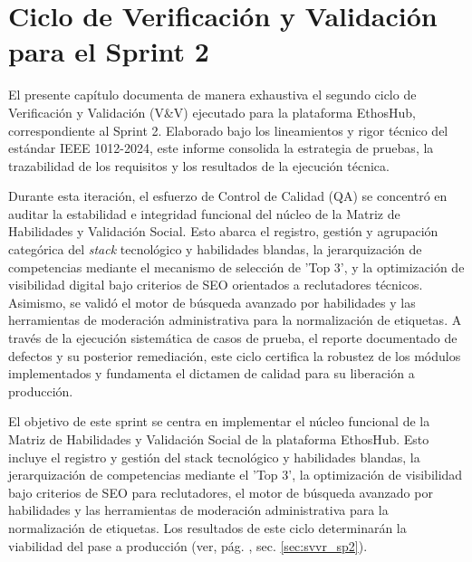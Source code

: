 
\chapter{Ciclo de Verificación y Validación para el Sprint 2}
\label{ch:sprint2}

El presente capítulo documenta de manera exhaustiva el segundo ciclo de Verificación y Validación (V\&V) ejecutado para la plataforma EthosHub, correspondiente al Sprint 2. Elaborado bajo los lineamientos y rigor técnico del estándar IEEE 1012-2024, este informe consolida la estrategia de pruebas, la trazabilidad de los requisitos y los resultados de la ejecución técnica.\par

Durante esta iteración, el esfuerzo de Control de Calidad (QA) se concentró en auditar la estabilidad e integridad funcional del núcleo de la Matriz de Habilidades y Validación Social. Esto abarca el registro, gestión y agrupación categórica del \textit{stack} tecnológico y habilidades blandas, la jerarquización de competencias mediante el mecanismo de selección de 'Top 3', y la optimización de visibilidad digital bajo criterios de SEO orientados a reclutadores técnicos. Asimismo, se validó el motor de búsqueda avanzado por habilidades y las herramientas de moderación administrativa para la normalización de etiquetas. A través de la ejecución sistemática de casos de prueba, el reporte documentado de defectos y su posterior remediación, este ciclo certifica la robustez de los módulos implementados y fundamenta el dictamen de calidad para su liberación a producción.

\newpage
\begin{NotaTecnica}
El objetivo de este sprint se centra en implementar el núcleo funcional de la Matriz de Habilidades y Validación Social de la plataforma EthosHub. Esto incluye el registro y gestión del stack tecnológico y habilidades blandas, la jerarquización de competencias mediante el 'Top 3', la optimización de visibilidad bajo criterios de SEO para reclutadores, el motor de búsqueda avanzado por habilidades y las herramientas de moderación administrativa para la normalización de etiquetas. Los resultados de este ciclo determinarán la viabilidad del pase a producción (ver, pág. \pageref{sec:svvr_sp2}, sec. \ref{sec:svvr_sp2}).
\end{NotaTecnica}

